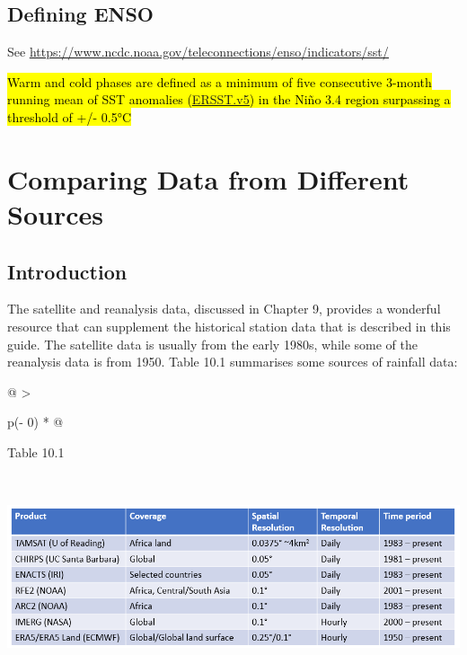 \documentclass[
  letterpaper,
  DIV=11,
  numbers=noendperiod]{scrreprt}
\begin{document}
\section{Defining ENSO}\label{defining-enso}

See
\href{https://www.ncdc.noaa.gov/teleconnections/enso/indicators/sst/}{\ul{https://www.ncdc.noaa.gov/teleconnections/enso/indicators/sst/}}

\hl{Warm and cold phases are defined as a minimum of five consecutive
3-month running mean of SST anomalies
(\href{http://origin.cpc.ncep.noaa.gov/products/analysis_monitoring/ensostuff/ONI_v5.php}{\ul{ERSST.v5}})
in the Niño 3.4 region surpassing a threshold of +/- 0.5°C}


\chapter{Comparing Data from Different
Sources}\label{comparing-data-from-different-sources}

\section{Introduction}\label{introduction-8}

The satellite and reanalysis data, discussed in Chapter 9, provides a
wonderful resource that can supplement the historical station data that
is described in this guide. The satellite data is usually from the early
1980s, while some of the reanalysis data is from 1950. Table 10.1
summarises some sources of rainfall data:

\begin{longtable}[]{@{}
  >{\raggedright\arraybackslash}p{(\columnwidth - 0\tabcolsep) * }@{}}
\toprule\noalign{}
\begin{minipage}[b]{\linewidth}\raggedright
Table 10.1
\end{minipage} \\
\midrule\noalign{}
\endhead
\bottomrule\noalign{}
\endlastfoot
\includegraphics[width=6.26806in,height=1.96944in]{figures/Table10.1.png} \\
\end{longtable}
\end{document}
